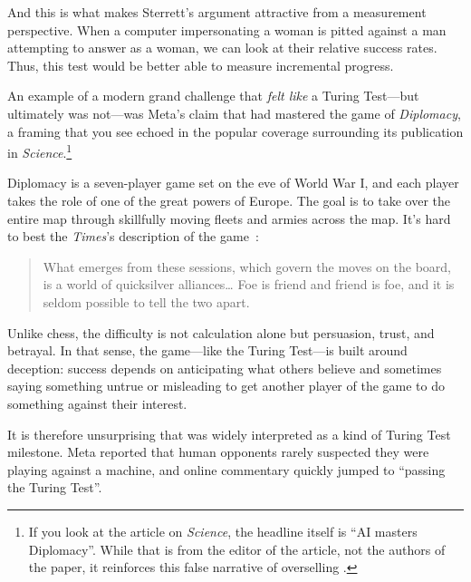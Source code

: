 And this is what makes Sterrett's argument attractive from a
measurement perspective.
%
When a computer impersonating a woman is pitted against a man
attempting to answer as a woman, we can look at their relative success
rates.
%
Thus, this test would be better able to measure incremental progress.

An example of a modern grand challenge that \emph{felt like} a Turing
Test---but ultimately was not---was Meta’s claim that  had
mastered the game of \emph{Diplomacy}, a framing that you see echoed in
the popular coverage surrounding its publication in
\emph{Science}.\footnote{If you look at the article on
  \textit{Science}, the headline itself is ``AI masters Diplomacy''.
  While that is from the editor of the article, not the authors of the
  paper, it reinforces this false narrative of overselling .}


Diplomacy is a seven-player game set on the eve of World War I, and
each player takes the role of one of the great powers of Europe.
%
The goal is to take over the entire map through skillfully moving
fleets and armies across the map.
%
It's hard to best the \textit{Times}'s description of the game~\citep{fox-13}:
\begin{quote}
What emerges from these sessions, which govern the moves on the board,
is a world of quicksilver alliances\dots
Foe is friend and friend is foe, and it is seldom possible to tell the two apart.
\end{quote}

Unlike chess, the difficulty is not calculation alone but persuasion,
trust, and betrayal.
%
In that sense, the game---like the Turing Test---is built around
deception: success depends on anticipating what others believe and
sometimes saying something untrue or misleading to get another player
of the game to do something against their interest.

It is therefore unsurprising that  was widely interpreted as a
kind of Turing Test milestone.
%
Meta reported that human opponents rarely suspected they were playing
against a machine, and online commentary quickly jumped to ``passing
the Turing Test''.



